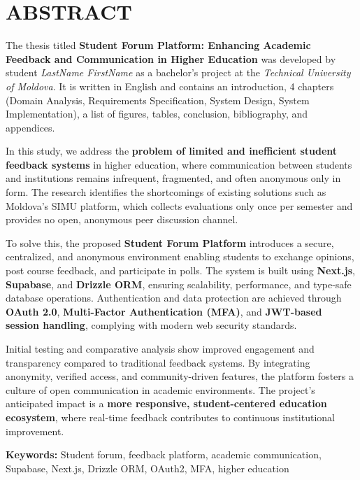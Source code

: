 \chapter*{ABSTRACT}
\thispagestyle{empty}


The thesis titled \textbf{Student Forum Platform: Enhancing Academic Feedback and Communication in Higher Education} was developed by student \textit{LastName FirstName} as a bachelor's project at the \textit{Technical University of Moldova}. It is written in English and contains an introduction, 4 chapters (Domain Analysis, Requirements Specification, System Design, System Implementation), a list of figures, tables, conclusion, bibliography, and appendices.



In this study, we address the \textbf{problem of limited and inefficient student feedback systems} in higher education, where communication between students and institutions remains infrequent, fragmented, and often anonymous only in form. The research identifies the shortcomings of existing solutions such as Moldova’s SIMU platform, which collects evaluations only once per semester and provides no open, anonymous peer discussion channel.

To solve this, the proposed \textbf{Student Forum Platform} introduces a secure, centralized, and anonymous environment enabling students to exchange opinions, post course feedback, and participate in polls. The system is built using \textbf{Next.js}, \textbf{Supabase}, and \textbf{Drizzle ORM}, ensuring scalability, performance, and type-safe database operations. Authentication and data protection are achieved through \textbf{OAuth 2.0}, \textbf{Multi-Factor Authentication (MFA)}, and \textbf{JWT-based session handling}, complying with modern web security standards.

Initial testing and comparative analysis show improved engagement and transparency compared to traditional feedback systems. By integrating anonymity, verified access, and community-driven features, the platform fosters a culture of open communication in academic environments. The project’s anticipated impact is a \textbf{more responsive, student-centered education ecosystem}, where real-time feedback contributes to continuous institutional improvement.

\textbf{Keywords:} Student forum, feedback platform, academic communication, Supabase, Next.js, Drizzle ORM, OAuth2, MFA, higher education